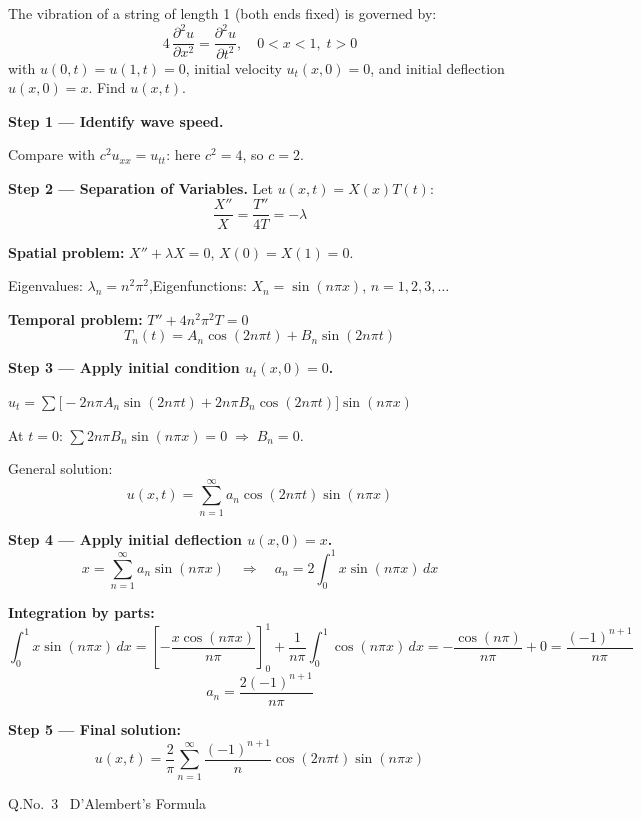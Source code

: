 \documentclass[12pt]{article}
\begin{document}
\medskip
The vibration of a string of length 1 (both ends fixed) is governed by:
\[
  4\,\frac{\partial^2 u}{\partial x^2}=\frac{\partial^2 u}{\partial t^2},\quad 0<x<1,\;t>0
\]
with $u(0,t)=u(1,t)=0$, initial velocity $u_t(x,0)=0$, and initial deflection $u(x,0)=x$. Find $u(x,t)$.

\begin{ansbox}
\textbf{Step 1 — Identify wave speed.}

Compare with $c^2 u_{xx}=u_{tt}$: here $c^2=4$, so $c=2$.

\medskip
\textbf{Step 2 — Separation of Variables.} Let $u(x,t)=X(x)T(t)$:
\[
  \frac{X''}{X}=\frac{T''}{4T}=-\lambda
\]

\textbf{Spatial problem:} $X''+\lambda X=0$, $X(0)=X(1)=0$.

Eigenvalues: $\lambda_n = n^2\pi^2$,\quad Eigenfunctions: $X_n = \sin(n\pi x)$,\; $n=1,2,3,\ldots$

\textbf{Temporal problem:} $T''+4n^2\pi^2 T=0$
\[
  T_n(t)=A_n\cos(2n\pi t)+B_n\sin(2n\pi t)
\]

\textbf{Step 3 — Apply initial condition $u_t(x,0)=0$.}

$u_t = \sum\bigl[-2n\pi A_n\sin(2n\pi t)+2n\pi B_n\cos(2n\pi t)\bigr]\sin(n\pi x)$

At $t=0$: $\sum 2n\pi B_n\sin(n\pi x)=0\;\Rightarrow\;B_n=0$.

General solution:
\[
  u(x,t)=\sum_{n=1}^{\infty}a_n\cos(2n\pi t)\sin(n\pi x)
\]

\textbf{Step 4 — Apply initial deflection $u(x,0)=x$.}
\[
  x = \sum_{n=1}^{\infty}a_n\sin(n\pi x)
  \quad\Rightarrow\quad
  a_n = 2\int_0^1 x\sin(n\pi x)\,dx
\]

\textbf{Integration by parts:}
\[
  \int_0^1 x\sin(n\pi x)\,dx
  = \left[-\frac{x\cos(n\pi x)}{n\pi}\right]_0^1+\frac{1}{n\pi}\int_0^1\cos(n\pi x)\,dx
  = -\frac{\cos(n\pi)}{n\pi}+0
  = \frac{(-1)^{n+1}}{n\pi}
\]
\[
  a_n = \frac{2(-1)^{n+1}}{n\pi}
\]

\textbf{Step 5 — Final solution:}
\[
  \boxed{u(x,t)=\frac{2}{\pi}\sum_{n=1}^{\infty}\frac{(-1)^{n+1}}{n}\cos(2n\pi t)\sin(n\pi x)}
\]
\end{ansbox}

\newpage

\begin{qbox}{Q.No.\ 3 \textemdash\ D'Alembert's Formula}
\end{qbox}
\end{document}
